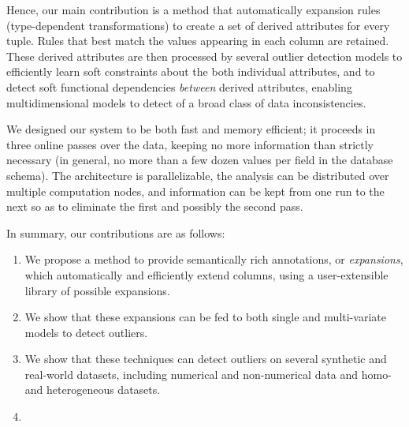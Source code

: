 Hence, our main contribution is a method that automatically expansion rules (type-dependent transformations) to create a set of derived attributes for every tuple. Rules that best match the values appearing in each column are retained.
These derived attributes are then processed by several outlier detection models to efficiently learn soft constraints about the both individual attributes, and to detect soft functional dependencies \textit{between} derived attributes, enabling multidimensional models to detect of a broad class of data inconsistencies.



We designed our system to be both fast and memory efficient; it proceeds in three online passes over the data, keeping no more information than strictly necessary (in general, no more than a few dozen values per field in the database schema). The architecture is parallelizable, the analysis can be distributed over multiple computation nodes, and information can be kept from one run to the next so as to eliminate the first and possibly the second pass.


In summary, our contributions are as follows:
\begin{enumerate}
\item We propose a method to provide semantically rich annotations, or \emph{expansions}, which automatically and efficiently extend columns, using a user-extensible library of possible expansions.
\item We show that these expansions can be fed to both single and multi-variate models to detect outliers.
\item We show that these techniques can detect outliers on several synthetic and real-world datasets, including 
 numerical and non-numerical data and homo- and heterogeneous datasets.
\item 
\end{enumerate}

